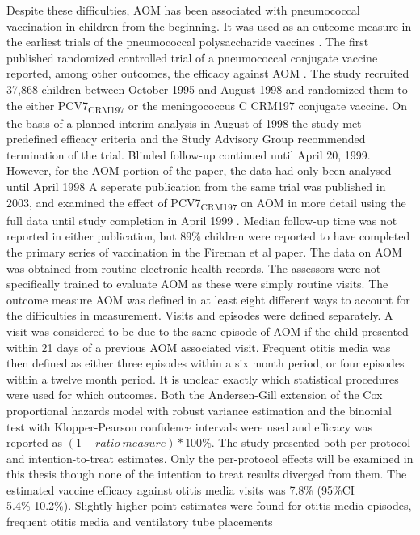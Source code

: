 \documentclass[]{book}
\theoremstyle{definition}
\theoremstyle{definition}
\theoremstyle{definition}
\theoremstyle{remark}
\begin{document}
Despite these difficulties, AOM has been associated with pneumococcal
vaccination in children from the beginning. It was used as an outcome
measure in the earliest trials of the pneumococcal polysaccharide
vaccines \citep{Makela1981, Sloyer1981}. The first published randomized
controlled trial of a pneumococcal conjugate vaccine reported, among
other outcomes, the efficacy against AOM \citep{Black2000}. The study
recruited 37,868 children between October 1995 and August 1998 and
randomized them to the either PCV7\textsubscript{CRM197} or the
meningococcus C CRM197 conjugate vaccine. On the basis of a planned
interim analysis in August of 1998 the study met predefined efficacy
criteria and the Study Advisory Group recommended termination of the
trial. Blinded follow-up continued until April 20, 1999. However, for
the AOM portion of the paper, the data had only been analysed until
April 1998 A seperate publication from the same trial was published in
2003, and examined the effect of PCV7\textsubscript{CRM197} on AOM in
more detail using the full data until study completion in April 1999
\citep{Fireman2003}. Median follow-up time was not reported in either
publication, but 89\% children were reported to have completed the
primary series of vaccination in the Fireman et al paper. The data on
AOM was obtained from routine electronic health records. The assessors
were not specifically trained to evaluate AOM as these were simply
routine visits. The outcome measure AOM was defined in at least eight
different ways to account for the difficulties in measurement. Visits
and episodes were defined separately. A visit was considered to be due
to the same episode of AOM if the child presented within 21 days of a
previous AOM associated visit. Frequent otitis media was then defined as
either three episodes within a six month period, or four episodes within
a twelve month period. It is unclear exactly which statistical
procedures were used for which outcomes. Both the Andersen-Gill
extension of the Cox proportional hazards model with robust variance
estimation and the binomial test with Klopper-Pearson confidence
intervals were used and efficacy was reported as
\((1 - ratio\ measure) *100\%\). The study presented both per-protocol
and intention-to-treat estimates. Only the per-protocol effects will be
examined in this thesis though none of the intention to treat results
diverged from them. The estimated vaccine efficacy against otitis media
visits was 7.8\% (95\%CI 5.4\%-10.2\%). Slightly higher point estimates
were found for otitis media episodes, frequent otitis media and
ventilatory tube placements \citep{Black2000, Fireman2003}
\end{document}
